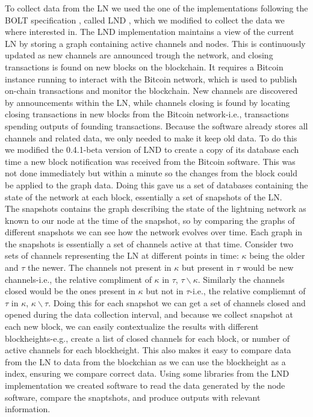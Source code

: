 To collect data from the LN we used the one of the implementations following the BOLT specification \cite{bolt}, called LND \cite{lnd}, which we modified to collect the data we where interested in. The LND implementation maintains a view of the current LN by storing a graph containing active channels and nodes. This is continuously updated as new channels are announced trough the network, and closing transactions is found on new blocks on the blockchain. It requires a Bitcoin instance running to interact with the Bitcoin network, which is used to publish on-chain transactions and monitor the blockchain. New channels are discovered by announcements within the LN, while channels closing is found by locating closing transactions in new blocks from the Bitcoin network-i.e., transactions spending outputs of founding transactions. 
Because the software already stores all channels and related data, we only needed to make it keep old data.
To do this we modified the 0.4.1-beta version of LND to create a copy of its database each time a new block notification was received from the Bitcoin software. This was not done immediately but within a minute so the changes from the block could be applied to the graph data. Doing this gave us a set of databases containing the state of the network at each block, essentially a set of snapshots of the LN.
\\


The snapshots contains the graph describing the state of the lightning network as known to our node at the time of the snapshot, so by comparing the graphs of different snapshots we can see how the network evolves over time. 
Each graph in the snapshots is essentially a set of channels active at that time. Consider two sets of channels representing the LN at different points in time: \(\kappa\) being the older and \(\tau\) the newer. The channels not present in \(\kappa\) but present in \(\tau\) would be new channels-i.e., the relative compliment of \(\kappa\) in \(\tau\), \( \tau \backslash{}\kappa\). Similarly the channels closed would be the ones present in \(\kappa\) but not in \(\tau\)-i.e., the relative compliemnt of \(\tau\) in \(\kappa\), \(\kappa\backslash{}\tau\). Doing this for each snapshot we can get a set of channels closed and opened during the data collection interval, and because we collect snapshot at each new block, we can easily contextualize the results with different blockheights-e.g., create a list of closed channels for each block, or number of active channels for each blockheight. This also makes it easy to compare data from the LN to data from the blockchian as we can use the blockheight as a index, ensuring we compare correct data.
Using some libraries from the LND implementation we created software to read the data generated by the node software, compare the snaptshots, and produce outputs with relevant information.
\\

